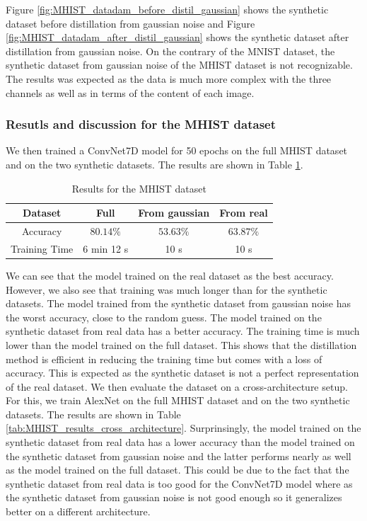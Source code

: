 \documentclass[onecolumn]{IEEEtran}
\begin{document}
Figure \ref{fig:MHIST_datadam_before_distil_gaussian} shows the synthetic dataset before distillation from gaussian noise and Figure \ref{fig:MHIST_datadam_after_distil_gaussian} shows the synthetic dataset after distillation from gaussian noise. On the contrary of the MNIST dataset, the synthetic dataset from gaussian noise of the MHIST dataset is not recognizable. The results was expected as the data is much more complex with the three channels as well as in terms of the content of each image.
\\
\subsubsection{Resutls and discussion for the MHIST dataset}
\label{sec:MHIST_results}
We then trained a ConvNet7D model for 50 epochs on the full MHIST dataset and on the two synthetic datasets. The results are shown in Table \ref{tab:MHIST_results}.

\begin{table}[H]
    \centering
    \begin{tabular}{|c|c|c|c|}
        \hline
        Dataset & Full & From gaussian & From real \\
        \hline
        Accuracy & $80.14\%$ & $53.63\%$ & $63.87\%$ \\
        \hline
        Training Time & 6 min 12 s & 10 s & 10 s \\
        \hline
    \end{tabular}
    \caption{Results for the MHIST dataset}
    \label{tab:MHIST_results}
\end{table}

We can see that the model trained on the real dataset as the best accuracy. However, we also see that training was much longer than for the synthetic datasets. The model trained from the synthetic dataset from gaussian noise has the worst accuracy, close to the random guess. The model trained on the synthetic dataset from real data has a better accuracy. The training time is much lower than the model trained on the full dataset. This shows that the distillation method is efficient in reducing the training time but comes with a loss of accuracy. This is expected as the synthetic dataset is not a perfect representation of the real dataset.
We then evaluate the dataset on a cross-architecture setup. For this, we train AlexNet on the full MHIST dataset and on the two synthetic datasets. The results are shown in Table \ref{tab:MHIST_results_cross_architecture}. Surprinsingly, the model trained on the synthetic dataset from real data has a lower accuracy than the model trained on the synthetic dataset from gaussian noise and the latter performs nearly as well as the model trained on the full dataset. This could be due to the fact that the synthetic dataset from real data is too good for the ConvNet7D model where as the synthetic dataset from gaussian noise is not good enough so it generalizes better on a different architecture.
\end{document}
